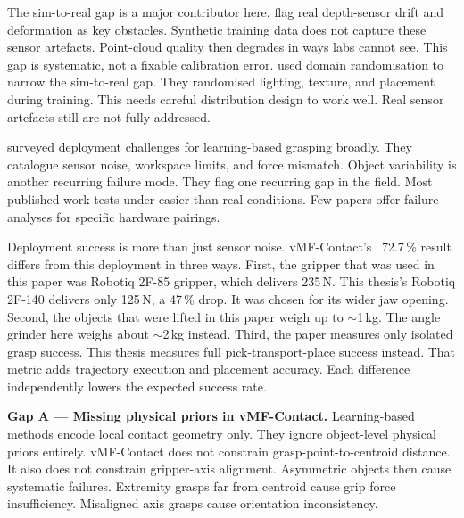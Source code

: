 \documentclass[oneside,studentpaper]{wbk}
\begin{document}
The sim-to-real gap is a major contributor here. \cite{cai2024} flag real depth-sensor drift and deformation as key obstacles. Synthetic training data does not capture these sensor artefacts. Point-cloud quality then degrades in ways labs cannot see. This gap is systematic, not a fixable calibration error. \cite{tobin2017domain} used domain randomisation to narrow the sim-to-real gap. They randomised lighting, texture, and placement during training. This needs careful distribution design to work well. Real sensor artefacts still are not fully addressed.

\cite{kleeberger2020survey} surveyed deployment challenges for learning-based grasping broadly. They catalogue sensor noise, workspace limits, and force mismatch. Object variability is another recurring failure mode. They flag one recurring gap in the field. Most published work tests under easier-than-real conditions. Few papers offer failure analyses for specific hardware pairings.

Deployment success is more than just sensor noise. vMF-Contact's~\cite{shi2025} 72.7\,\% result differs from this deployment in three ways. First, the gripper that was used in this paper was Robotiq 2F-85 gripper, which delivers 235\,N. This thesis's Robotiq 2F-140 delivers only 125\,N, a 47\,\% drop. It was chosen for its wider jaw opening. Second, the objects that were lifted in this paper weigh up to $\sim$1\,kg. The angle grinder here weighs about $\sim$2\,kg instead. Third, the paper measures only isolated grasp success. This thesis measures full pick-transport-place success instead. That metric adds trajectory execution and placement accuracy. Each difference independently lowers the expected success rate.



\textbf{Gap A --- Missing physical priors in vMF-Contact.} Learning-based methods encode local contact geometry only. They ignore object-level physical priors entirely. vMF-Contact does not constrain grasp-point-to-centroid distance. It also does not constrain gripper-axis alignment. Asymmetric objects then cause systematic failures. Extremity grasps far from centroid cause grip force insufficiency. Misaligned axis grasps cause orientation inconsistency.
\end{document}

